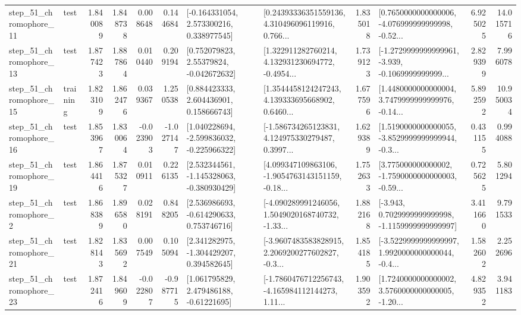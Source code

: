 \begin{tabular}{llrrrrllrlrr}
   step\_51\_chromophore\_11 &      test &      1.840089 &    1.848738 &      0.008648 &  0.144684 &    [-0.164331054, 2.573300216, 0.338977545] &  [0.24393336351559136, 4.310496096119916, 0.766... &       1.835018 &  [0.7650000000000006, -4.076999999999998, -0.52... &            6.925025 &         14.015716 \\
   step\_51\_chromophore\_13 &      test &      1.877423 &    1.887864 &      0.010440 &  0.209194 &     [0.752079823, 2.55379824, -0.042672632] &  [1.322911282760214, 4.132931230694772, -0.4954... &       1.739123 &  [-1.2729999999999961, -3.939, -0.1069999999999... &            2.829399 &          7.996078 \\
   step\_51\_chromophore\_15 &  training &      1.823109 &    1.862476 &      0.039367 &  1.250538 &     [0.884423333, 2.604436901, 0.158666743] &  [1.3544458124247243, 4.139333695668902, 0.6460... &       1.677596 &  [1.4480000000000004, 3.7479999999999976, -0.14... &            5.892592 &         10.950034 \\
   step\_51\_chromophore\_16 &      test &      1.853967 &    1.830064 &     -0.023903 & -1.027147 &   [1.040228694, -2.599836032, -0.225966322] &  [-1.586734265123831, 4.124975330279487, 0.3997... &       1.629389 &  [1.5190000000000055, -3.8529999999999944, -0.3... &            0.431155 &          0.994088 \\
   step\_51\_chromophore\_19 &      test &      1.864416 &    1.875327 &      0.010911 &  0.226135 &   [2.532344561, -1.145328063, -0.380930429] &  [4.099347109863106, -1.9054763143151159, -0.18... &       1.752633 &  [3.775000000000002, -1.7590000000000003, -0.59... &            0.725625 &          5.801294 \\
    step\_51\_chromophore\_2 &      test &      1.868389 &    1.896580 &      0.028191 &  0.848205 &    [2.536986693, -0.614290633, 0.753746716] &  [-4.090289991246056, 1.5049020168740732, -1.33... &       1.882168 &  [-3.943, 0.7029999999999998, -1.1159999999999997] &            3.411660 &          9.791533 \\
   step\_51\_chromophore\_21 &      test &      1.828143 &    1.835692 &      0.007549 &  0.105094 &    [2.341282975, -1.304429207, 0.394582645] &  [-3.9607483583828915, 2.2069200277602827, -0.3... &       1.854185 &  [-3.5229999999999997, 1.9920000000000044, -0.4... &            1.582602 &          2.252696 \\
   step\_51\_chromophore\_23 &      test &      1.872416 &    1.849609 &     -0.022807 & -0.987715 &     [1.061795829, 2.479486188, -0.61221695] &  [-1.7860476712256743, -4.165984112144273, 1.11... &       1.903592 &  [1.7240000000000002, 3.5760000000000005, -1.20... &            4.829352 &          3.941183 \\

\end{tabular}
